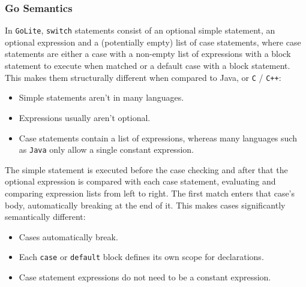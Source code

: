 \documentclass[11pt]{article}
\begin{document}
\subsubsection{Go Semantics}
\label{sec:org878df65}
In \texttt{GoLite}, \texttt{switch} statements consist of an optional simple
statement, an optional expression and a (potentially empty) list
of case statements, where case statements are either a case with a
non-empty list of expressions with a block statement to execute
when matched or a default case with a block statement. This makes
them structurally different when compared to Java, or \texttt{C} / \texttt{C++}:
\begin{itemize}
\item Simple statements aren't in many languages.
\item Expressions usually aren't optional.
\item Case statements contain a list of expressions, whereas many
languages such as \texttt{Java} only allow a single constant expression.
\end{itemize}
The simple statement is executed before the case checking and
after that the optional expression is compared with each case
statement, evaluating and comparing expression lists from left to
right. The first match enters that case's body, automatically
breaking at the end of it. This makes cases significantly semantically different:
\begin{itemize}
\item Cases automatically break.
\item Each \texttt{case} or \texttt{default} block defines its own scope for declarations.
\item Case statement expressions do not need to be a constant expression.
\end{itemize}
\end{document}
